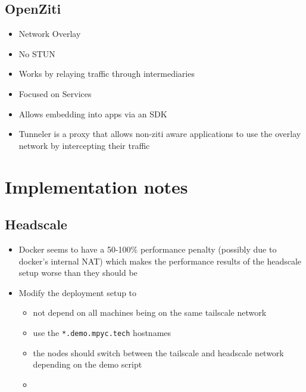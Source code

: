 \label{notes__02180-openziti.md}
\section{OpenZiti}\label{notes__02180-openziti.md__openziti}

\begin{itemize}
\tightlist
\item
  Network Overlay
\item
  No STUN
\item
  Works by relaying traffic through intermediaries
\item
  Focused on Services
\item
  Allows embedding into apps via an SDK
\item
  Tunneler is a proxy that allows non-ziti aware applications to use the overlay network by intercepting their traffic
\end{itemize}

\label{notes__03000-implementations.md}
\chapter{Implementation notes}\label{notes__03000-implementations.md__implementation-notes}

\section{Headscale}\label{notes__03000-implementations.md__headscale}

\begin{itemize}
\tightlist
\item
  Docker seems to have a 50-100\% performance penalty (possibly due to docker's internal NAT) which makes the performance results of the headscale setup worse than they should be
\item
  Modify the deployment setup to

  \begin{itemize}
  \tightlist
  \item
    not depend on all machines being on the same tailscale network
  \item
    use the \texttt{*.demo.mpyc.tech} hostnames
  \item
    the nodes should switch between the tailscale and headscale network depending on the demo script
  \item
  \end{itemize}
\end{itemize}

